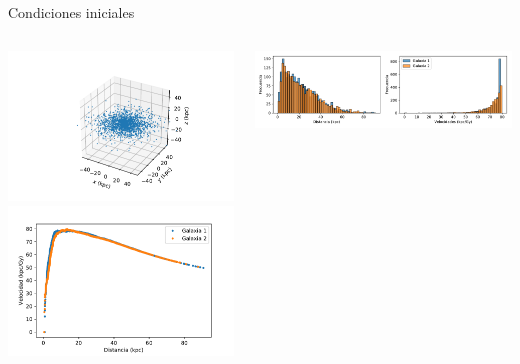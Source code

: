 \documentclass{beamer}
\begin{document}
\begin{frame}{Condiciones iniciales}
	\begin{columns}
		\begin{column}{0.5\textwidth}
			\includegraphics[height=0.35\textheight]{sources/images/galaxy_shape.pdf}\\\pause
			\includegraphics[height=0.35\textheight]{sources/images/rotation_curve.pdf}\pause
		\end{column}
		\begin{column}{0.5\textwidth}
			\includegraphics[width=\linewidth]{sources/images/galaxy_distribution.pdf}\\\pause

\end{column}
\end{columns}
\end{frame}
\end{document}
